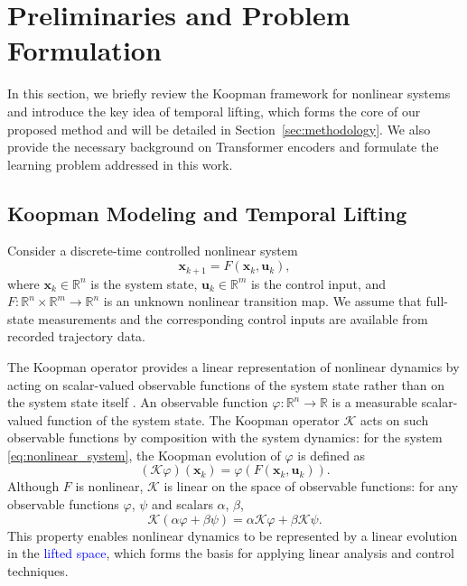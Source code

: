 \documentclass[journal]{IEEEtran}
\newcommand{\vx}{\mathbf{x}}
\newcommand{\vu}{\mathbf{u}}
\begin{document}
\section{Preliminaries and Problem Formulation}
\label{sec:preliminaries_and_problem}

In this section, we briefly review the Koopman framework for nonlinear systems and introduce the key idea of temporal lifting, which forms the core of our proposed method and will be detailed in Section~\ref{sec:methodology}. We also provide the necessary background on Transformer encoders and formulate the learning problem addressed in this work.

\subsection{Koopman Modeling and Temporal Lifting}
\label{sec:preliminary}

Consider a discrete-time controlled nonlinear system
\begin{equation}
    \vx_{k+1} = F(\vx_k, \vu_k),
    \label{eq:nonlinear_system}
\end{equation}
where $\vx_k \in \mathbb{R}^n$ is the system state, $\vu_k \in \mathbb{R}^m$ is the control input, and $F:\mathbb{R}^n \times \mathbb{R}^m \to \mathbb{R}^n$ is an unknown nonlinear transition map. We assume that full-state measurements and the corresponding control inputs are available from recorded trajectory data.

The Koopman operator provides a linear representation of nonlinear dynamics by acting on scalar-valued observable functions of the system state rather than on the system state itself \cite{koopman1931hamiltonian, mezic2005spectral, rowley2009spectral, brunton2022modern}. An observable function $\varphi:\mathbb{R}^n\to\mathbb{R}$ is a measurable scalar-valued function of the system state. The Koopman operator $\mathcal{K}$ acts on such observable functions by composition with the system dynamics: for the system \eqref{eq:nonlinear_system}, the Koopman evolution of $\varphi$ is defined as
\begin{equation}
    (\mathcal{K}\varphi)(\vx_k) = \varphi(F(\vx_k,\vu_k)).
    \label{eq:koopman_operator}
\end{equation}
Although $F$ is nonlinear, $\mathcal{K}$ is linear on the space of observable functions: for any observable functions $\varphi$, $\psi$ and scalars $\alpha$, $\beta$,
\begin{equation}
    \mathcal{K}(\alpha \varphi + \beta \psi)
    = \alpha \mathcal{K}\varphi + \beta \mathcal{K}\psi.
    \label{eq:koopman_linearity}
\end{equation}
This property enables nonlinear dynamics to be represented by a linear evolution in the \textcolor{blue}{lifted space}, which forms the basis for applying linear analysis and control techniques.
\end{document}
